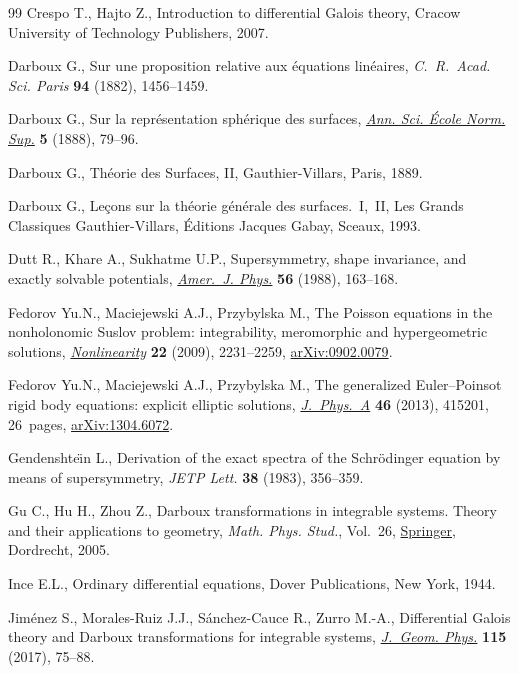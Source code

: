 \documentclass[10pt,a4paper]{amsart}
\numberwithin{equation}{section}
\begin{document}
\begin{thebibliography}{99}
Crespo T., Hajto Z., Introduction to differential {G}alois theory, Cracow
 University of Technology Publishers, 2007.

Darboux G., Sur une proposition relative aux \'equations lin\'eaires,
 \textit{C.~R.~Acad. Sci. Paris} \textbf{94} (1882), 1456--1459.

Darboux G., Sur la repr\'esentation sph\'erique des surfaces, \href{https://doi.org/10.24033/asens.307}{\textit{Ann. Sci.
 \'Ecole Norm. Sup.}} \textbf{5} (1888), 79--96.

Darboux G., Th\'eorie des Surfaces, II, Gauthier-Villars, Paris, 1889.

Darboux G., Le\c{c}ons sur la th\'eorie g\'en\'erale des surfaces.~{I},~{II},
 Les Grands Classiques Gauthier-Villars, \'Editions Jacques Gabay, Sceaux,
 1993.

Dutt R., Khare A., Sukhatme U.P., Supersymmetry, shape invariance, and exactly
 solvable potentials, \href{https://doi.org/10.1119/1.15697}{\textit{Amer.~J. Phys.}} \textbf{56} (1988), 163--168.

Fedorov Yu.N., Maciejewski A.J., Przybylska M., The {P}oisson equations in the
 nonholonomic {S}uslov problem: integrability, meromorphic and hypergeometric
 solutions, \href{https://doi.org/10.1088/0951-7715/22/9/009}{\textit{Nonlinearity}} \textbf{22} (2009), 2231--2259,
 \href{https://arxiv.org/abs/0902.0079}{arXiv:0902.0079}.

Fedorov Yu.N., Maciejewski A.J., Przybylska M., The generalized
 {E}uler--{P}oinsot rigid body equations: explicit elliptic solutions,
 \href{https://doi.org/10.1088/1751-8113/46/41/415201}{\textit{J.~Phys.~A}} \textbf{46} (2013), 415201, 26~pages, \href{https://arxiv.org/abs/1304.6072}{arXiv:1304.6072}.

Gendenshte\"{\i}n L., Derivation of the exact spectra of the {S}chr\"odinger
 equation by means of supersymmetry, \textit{JETP Lett.} \textbf{38} (1983),
 356--359.

Gu C., Hu H., Zhou Z., Darboux transformations in integrable systems. Theory
 and their applications to geometry, \textit{Math. Phys. Stud.}, Vol.~26,
 \href{https://doi.org/10.1007/1-4020-3088-6}{Springer}, Dordrecht, 2005.

Ince E.L., Ordinary differential equations, Dover Publications, New York, 1944.

Jim\'enez S., Morales-Ruiz J.J., S\'anchez-Cauce R., Zurro M.-A., Differential
 {G}alois theory and {D}arboux transformations for integrable systems,
 \href{https://doi.org/10.1016/j.geomphys.2016.06.016}{\textit{J.~Geom. Phys.}} \textbf{115} (2017), 75--88.


\end{thebibliography}
\end{document}
